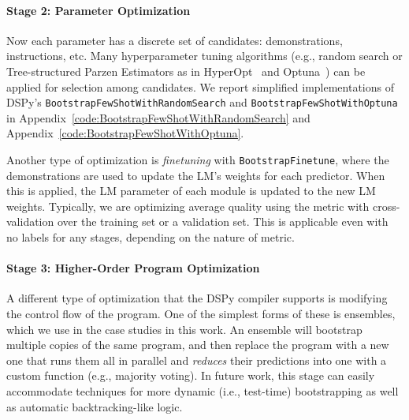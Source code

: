 \paragraph{Stage 2: Parameter Optimization}

Now each parameter has a discrete set of candidates: demonstrations, instructions, etc. Many hyperparameter tuning algorithms (e.g., random search or Tree-structured Parzen Estimators as in HyperOpt~\citep{bergstra2013making} and Optuna~\citep{akiba2019optuna}) can be applied for selection among candidates. We report simplified implementations of DSPy's \texttt{BootstrapFewShotWithRandomSearch} and \texttt{BootstrapFewShotWithOptuna} in {Appendix~\ref{code:BootstrapFewShotWithRandomSearch}} and {Appendix~\ref{code:BootstrapFewShotWithOptuna}}.

Another type of optimization is \textit{finetuning} with \texttt{BootstrapFinetune}, where the demonstrations are used to update the LM's weights for each predictor. When this is applied, the LM parameter of each module is updated to the new LM weights.
Typically, we are optimizing average quality using the metric with cross-validation over the training set or a validation set.
This is applicable even with no labels for any stages, depending on the nature of metric.%

\paragraph{Stage 3: Higher-Order Program Optimization} A different type of optimization that the DSPy compiler supports is modifying the control flow of the program. One of the simplest forms of these is ensembles, which we use in the case studies in this work. An ensemble will bootstrap multiple copies of the same program, and then replace the program with a new one that runs them all in parallel and \textit{reduces} their predictions into one with a custom function (e.g., majority voting). In future work, this stage can easily accommodate techniques for more dynamic (i.e., test-time) bootstrapping as well as automatic backtracking-like logic.









